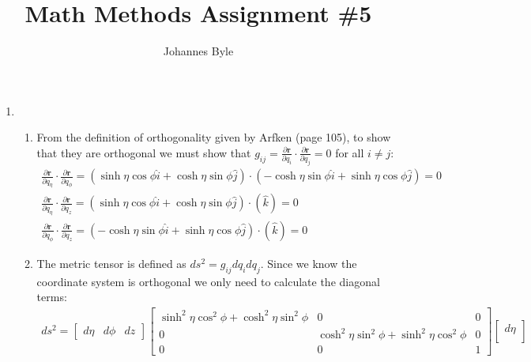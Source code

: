 \documentclass[12pt]{article}
\title{Math Methods Assignment \#5}
\author{Johannes Byle}
\newcommand{\p}[2]{\frac{\partial #1}{\partial #2}}
\begin{document}
    \maketitle
    \begin{enumerate}
        \item
        \begin{enumerate}
            \item From the definition of orthogonality given by Arfken (page 105), to show that they are orthogonal we must show that $g_{ij}=\p{\pmb{r}}{q_i}\cdot\p{\pmb{r}}{q_j}=0$ for all $i\neq j$:
            \begin{gather*}
                \p{\pmb{r}}{q_{\eta}}\cdot\p{\pmb{r}}{q_{\phi}}=
                \left(\sinh\eta\cos\phi\hat{i}+\cosh\eta\sin\phi\hat{j}\right)\cdot
                \left(-\cosh\eta\sin\phi\hat{i}+\sinh\eta\cos\phi\hat{j}\right)=0\\
                \p{\pmb{r}}{q_{\eta}}\cdot\p{\pmb{r}}{q_z}=
                \left(\sinh\eta\cos\phi\hat{i}+\cosh\eta\sin\phi\hat{j}\right)\cdot
                \left(\hat{k}\right)=0\\
                \p{\pmb{r}}{q_{\phi}}\cdot\p{\pmb{r}}{q_z}=
                \left(-\cosh\eta\sin\phi\hat{i}+\sinh\eta\cos\phi\hat{j}\right)\cdot
                \left(\hat{k}\right)=0
            \end{gather*}
            \item The metric tensor is defined as $ds^2=g_{ij}dq_i dq_j$.
            Since we know the coordinate system is orthogonal we only need to calculate the diagonal terms:
            \begin{gather*}
                ds^2=
                \begin{bmatrix}
                    d\eta & d\phi & dz
                \end{bmatrix}
                \begin{bmatrix}
                    \sinh^2\eta\cos^2\phi+\cosh^2\eta\sin^2\phi & 0                                           & 0 \\
                    0                                           & \cosh^2\eta\sin^2\phi+\sinh^2\eta\cos^2\phi & 0 \\
                    0                                           & 0                                           & 1
                \end{bmatrix}
                \begin{bmatrix}
                    d\eta \\

\end{bmatrix}
\end{gather*}
\end{enumerate}
\end{enumerate}
\end{document}
